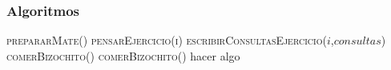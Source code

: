 \subsubsection*{Algoritmos}
\begin{algorithm}[H]
  \begin{algorithmic}[1]
    \State{} 
    \State{} 
    \State{}
    \State\textsc{prepararMate()} 
    \State\textsc{pensarEjercicio(i)}
      \State\textsc{escribirConsultasEjercicio($i$,$consultas$)}
    \Else
      \State\textsc{comerBizochito()}
    \EndIf
      \State\textsc{comerBizochito()}
    \EndWhile
         \State hacer algo
    \EndFor
    \State{}
  \end{algorithmic}
\end{algorithm}
\newpage

